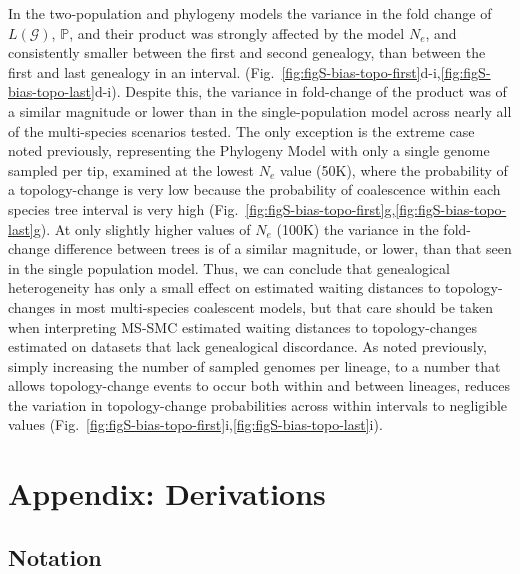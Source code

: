 \documentclass[11pt]{article}
\begin{document}
% 
In the two-population and phylogeny models the variance in the fold change of 
$L(\mathcal{G})$, $\mathbb{P}$, and their product was strongly affected by the
model $N_e$, and consistently smaller between the first and second genealogy, 
than between the first and last genealogy in an interval.
(Fig.~\ref{fig:figS-bias-topo-first}d-i,\ref{fig:figS-bias-topo-last}d-i). 
% 
Despite this, the variance in fold-change of the product was of a similar
magnitude or lower than in the single-population model across nearly 
all of the multi-species scenarios tested.
% 
The only exception is the extreme case noted previously, representing the
Phylogeny Model with only a single genome sampled per tip, examined at the 
lowest $N_e$ value (50K), where the probability of a topology-change is 
very low because the probability of coalescence within each species tree
interval is very high
(Fig.~\ref{fig:figS-bias-topo-first}g,\ref{fig:figS-bias-topo-last}g).
% 
At only slightly higher values of $N_e$ (100K) the variance in the fold-change
difference between trees is of a similar magnitude, or lower, than that
seen in the single population model. 
% 
Thus, we can conclude that genealogical heterogeneity has only a small 
effect on estimated waiting distances to topology-changes in most 
multi-species coalescent models, but that care should be taken when 
interpreting MS-SMC estimated waiting distances to topology-changes estimated
on datasets that lack genealogical discordance. 
% 
As noted previously, simply increasing the number of sampled genomes
per lineage, to a number that allows topology-change events to occur both
within and between lineages, reduces the variation in topology-change 
probabilities across within intervals to negligible values
(Fig.~\ref{fig:figS-bias-topo-first}i,\ref{fig:figS-bias-topo-last}i).



\section{Appendix: Derivations}

\subsection{Notation}
\end{document}
